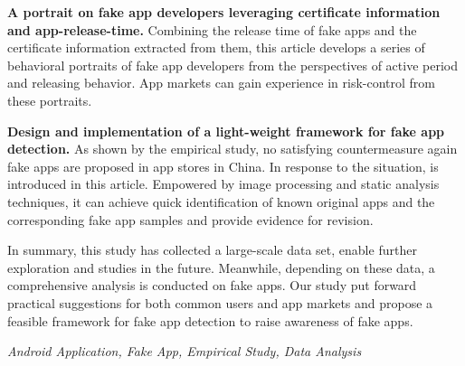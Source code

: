\textbf{A portrait on fake app developers leveraging certificate information and app-release-time. }
Combining the release time of fake apps and the certificate information extracted from them, this article develops a series of behavioral portraits of fake app developers from the perspectives of active period and releasing behavior.
App markets can gain experience in risk-control from these portraits.

\textbf{Design and implementation of a light-weight framework for fake app detection. }
As shown by the empirical study, no satisfying countermeasure again fake apps are proposed in app stores in China.
In response to the situation, \mytool is introduced in this article.
Empowered by image processing and static analysis techniques, it can achieve quick identification of known original apps and the corresponding fake app samples and provide evidence for revision.

In summary, this study has collected a large-scale data set, enable further exploration and studies in the future.
Meanwhile, depending on these data, a comprehensive analysis is conducted on fake apps.
Our study put forward practical suggestions for both common users and app markets and propose a feasible framework for fake app detection to raise awareness of fake apps.

{} \textit{Android Application, Fake App, Empirical Study, Data Analysis}
